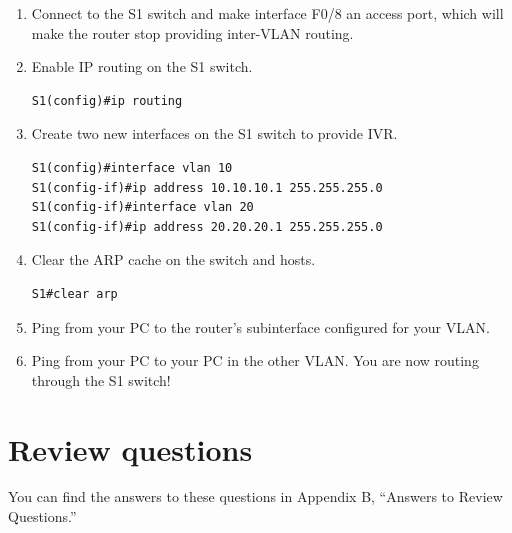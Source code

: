 \begin{enumerate}
\item
  Connect to the S1 switch and make interface F0/8 an access port, which
  will make the router stop providing inter-VLAN routing.
\item
  Enable IP routing on the S1 switch.

\begin{verbatim}
S1(config)#ip routing
\end{verbatim}
\item
  Create two new interfaces on the S1 switch to provide IVR.

\begin{verbatim}
S1(config)#interface vlan 10
S1(config-if)#ip address 10.10.10.1 255.255.255.0
S1(config-if)#interface vlan 20
S1(config-if)#ip address 20.20.20.1 255.255.255.0
\end{verbatim}
\item
  Clear the ARP cache on the switch and hosts.

\begin{verbatim}
S1#clear arp
\end{verbatim}
\item
  Ping from your PC to the router's subinterface configured for your
  VLAN.
\item
  Ping from your PC to your PC in the other VLAN. You are now routing
  through the S1 switch!
\end{enumerate}




\section{Review questions}

You can find the answers to these questions in Appendix B, ``Answers to Review Questions.''

